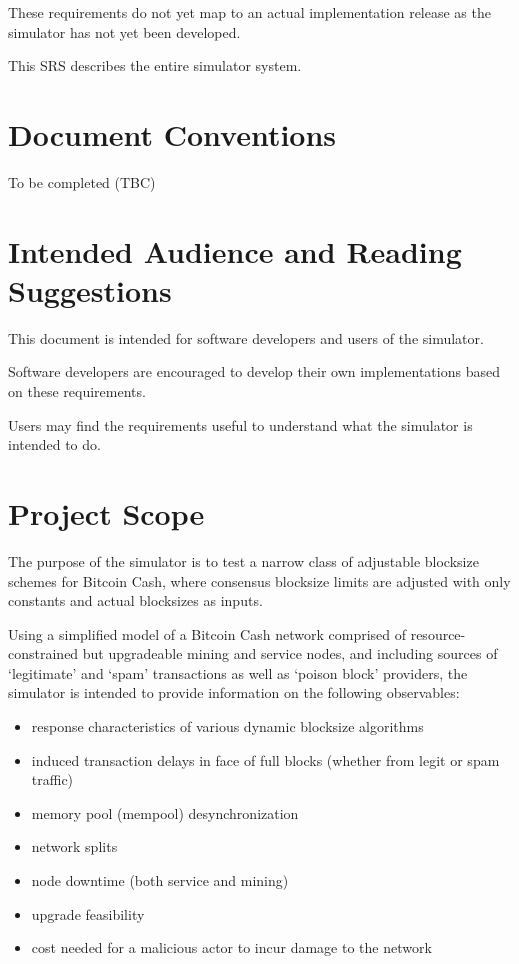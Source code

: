 \documentclass{scrreprt}
\begin{document}
These requirements do not yet map to an actual implementation release
as the simulator has not yet been developed.

This SRS describes the entire simulator system.


\section{Document Conventions}
To be completed (TBC)


\section{Intended Audience and Reading Suggestions}
This document is intended for software developers and users of the simulator.

Software developers are encouraged to develop their own implementations based
on these requirements.

Users may find the requirements useful to understand what the simulator is
intended to do.



\section{Project Scope}
The purpose of the simulator is to test a narrow class of adjustable
blocksize schemes for Bitcoin Cash, where consensus blocksize limits are
adjusted with only constants and actual blocksizes as inputs.

Using a simplified model of a Bitcoin Cash network comprised of resource-constrained
but upgradeable mining and service nodes, and including sources of `legitimate'
and `spam' transactions as well as `poison block' providers, the simulator is
intended to provide information on the following observables:

\begin{itemize}
\item response characteristics of various dynamic blocksize algorithms
\item induced transaction delays in face of full blocks (whether from legit or spam traffic)
\item memory pool (mempool) desynchronization
\item network splits
\item node downtime (both service and mining)
\item upgrade feasibility
\item cost needed for a malicious actor to incur damage to the network
\end{itemize}
\end{document}
